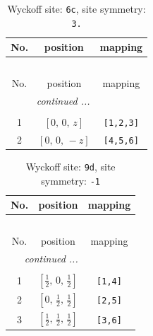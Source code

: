 \documentclass[fleqn,8pt]{jsarticle}
\begin{document}
\begin{longtable}{ccc}
\caption{Wyckoff site: {\tt 6c}, site symmetry: {\tt 3.}}
 \\
 \hline \hline
No. & position & mapping \\ \hline \endfirsthead

\multicolumn{2}{l}{\tablename\ \thetable{}} \\
 \hline \hline
No. & position & mapping \\ \hline \endhead

 \hline \hline
\multicolumn{2}{r}{\footnotesize\it continued ...} \\ \endfoot

 \hline \hline
\multicolumn{2}{r}{} \\ \endlastfoot

1 & $\left[ 0,\, 0,\, z \right]$ & {\tt [1,2,3]} \\ \hline
2 & $\left[ 0,\, 0,\, - z \right]$ & {\tt [4,5,6]} \\
\end{longtable}
\renewcommand{\arraystretch}{1.2}
\begin{longtable}{ccc}
\caption{Wyckoff site: {\tt 9d}, site symmetry: {\tt -1}}
 \\
 \hline \hline
No. & position & mapping \\ \hline \endfirsthead

\multicolumn{2}{l}{\tablename\ \thetable{}} \\
 \hline \hline
No. & position & mapping \\ \hline \endhead

 \hline \hline
\multicolumn{2}{r}{\footnotesize\it continued ...} \\ \endfoot

 \hline \hline
\multicolumn{2}{r}{} \\ \endlastfoot

1 & $\left[ \frac{1}{2},\, 0,\, \frac{1}{2} \right]$ & {\tt [1,4]} \\ \hline
2 & $\left[ 0,\, \frac{1}{2},\, \frac{1}{2} \right]$ & {\tt [2,5]} \\ \hline
3 & $\left[ \frac{1}{2},\, \frac{1}{2},\, \frac{1}{2} \right]$ & {\tt [3,6]} \\
\end{longtable}
\renewcommand{\arraystretch}{1.2}
\end{document}
